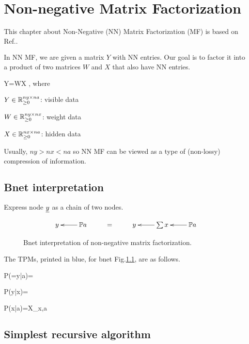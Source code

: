 \chapter{Non-negative Matrix Factorization}
\label{ch-nn-mat-fac}

This chapter about Non-Negative (NN) Matrix Factorization (MF) is based on Ref.\cite{wiki-nmf}.

In NN MF, we are given a
 matrix $Y$ with NN entries. Our goal is to factor it
 into a product of two matrices $W$ and $X$
 that also have NN entries.

\beq
Y=WX
\;,
\eeq 
where

$Y\in { \mathbb{R}}^{ny\times na}_{\geq 0}$: visible data

$W\in { \mathbb{R}}^{ny\times nx}_{\geq 0}$: weight data

$X\in { \mathbb{R}}^{nx\times na}_{\geq 0}$: hidden data


Usually, $ny > nx<na$ so 
NN MF can be viewed as a type of (non-lossy) compression of
information.

\section{Bnet 
interpretation}

 Express node $\rvy$ as a chain of 
 two nodes.

\begin{figure}[h!]
\centering
$$\xymatrix{
y& \PP a\ar[l]&= &y & \sum x\ar[l]&\PP a\ar[l]
}$$
\caption{Bnet interpretation of
non-negative matrix factorization.}
\label{fig-nmf}
\end{figure}
The TPMs, printed in blue,
for bnet Fig.\ref{fig-nmf},
are as follows.

\beq\color{blue}
P(\rvy=y|a)=
\eeq

\beq\color{blue}
P(y|x)=
\eeq

\beq\color{blue}
P(x|a)=X_{x,a}
\eeq

\section{Simplest recursive
 algorithm}

